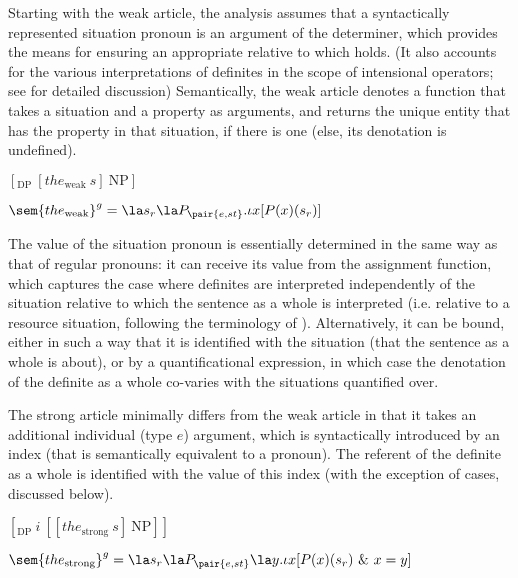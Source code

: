 \documentclass[output=paper
,modfonts
,nonflat]{langscibook}
\begin{document}
Starting with the weak article, the analysis assumes that a
syntactically represented situation pronoun is an argument of the
determiner, which provides the means for ensuring an appropriate
 relative to which  holds. (It also
accounts for the various interpretations of definites in the scope of
intensional operators; see \citealt{Schwarz2009} for detailed
discussion) Semantically, the weak article denotes a function that
takes a situation and a property as arguments, and returns the unique
entity that has the property in that situation, if there is one (else,
its denotation is undefined).

\begin{exe}
\ex\label{ex:schwarz:13}
\begin{xlist}
\ex\label{ex:schwarz:13a} $ [ _{\text{DP}}\ [the_{\text{weak}}\ s]\ \text{NP}]$

\ex\label{ex:schwarz:13b} $\sem{the_{\text{weak}}}^g = \la s_r\la P_{\pair{e,st}}.\iota x
[P(x)(s_r)]$ 
\end{xlist}
\end{exe}

The value of the situation pronoun is essentially determined in the
same way as that of regular pronouns: it can receive its value from
the assignment function, which captures the case where definites are
interpreted independently of the situation relative to which the
sentence as a whole is interpreted (i.e. relative to a resource
situation, following the terminology of
\citealt{Fintel1994}). Alternatively, it can be bound, either in such
a way that it is identified with the  situation (that the
sentence as a whole is about), or by a quantificational expression, in
which case the denotation of the definite as a whole co-varies with
the situations quantified over.

The strong article minimally differs from the weak article in that it
takes an additional individual (type $e$) argument, which is
syntactically introduced by an index (that is semantically equivalent
to a pronoun). The referent of the definite as a whole is identified
with the value of this index (with the exception of  cases,
discussed below). 

\begin{exe}
\ex\label{ex:schwarz:14}
\begin{xlist}
\ex\label{ex:schwarz:14a} $ [ _{\text{DP}}\ i\ [[the_{\text{strong}}\ s]\ \text{NP}]]$

\ex\label{ex:schwarz:14b} $\sem{the_{\text{strong}}}^g = \la s_r\la P_{\pair{e,st}}\la
y.\iota x [P(x)(s_r)\ \&\ x=y]$
\end{xlist}
\end{exe}
\end{document}
